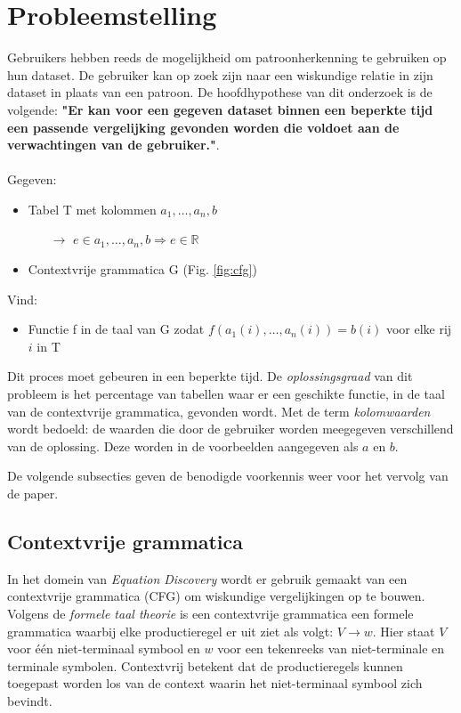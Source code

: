 \documentclass[Main.tex]{subfiles}
\begin{document}
\section{Probleemstelling}
Gebruikers hebben reeds de mogelijkheid om patroonherkenning te gebruiken op hun dataset. De gebruiker kan op zoek zijn naar een wiskundige relatie in zijn dataset in plaats van een patroon. De hoofdhypothese van dit onderzoek is de volgende: \textbf{"Er kan voor een gegeven dataset binnen een beperkte tijd een passende vergelijking gevonden worden die voldoet aan de verwachtingen van de gebruiker."}. \\ \\
\newpage
\noindent
Gegeven: 
\begin{itemize}
\item Tabel T met kolommen $a_{1},\dotsc,a_{n},b$ 
	\begin{itemize}
	\item[$\rightarrow$] $e \in a_{1},\dotsc,a_{n}, b \Rightarrow e \in \mathbb{R}$
	\end{itemize}
\item Contextvrije grammatica G (Fig. \ref{fig:cfg})
\end{itemize}
Vind:
\begin{itemize}
\item Functie f in de taal van G zodat $f(a_{1}(i),\dotsc ,a_{n}(i)) = b(i)$ voor elke rij $i$ in T
\end{itemize}
\noindent
Dit proces moet gebeuren in een beperkte tijd. De \textit{oplossingsgraad} van dit probleem is het percentage van tabellen waar er een geschikte functie, in de taal van de contextvrije grammatica, gevonden wordt. Met de term \textit{kolomwaarden} wordt bedoeld: de waarden die door de gebruiker worden meegegeven verschillend van de oplossing. Deze worden in de voorbeelden aangegeven als $a$ en $b$.

\par De volgende subsecties geven de benodigde voorkennis weer voor het vervolg van de paper.

\subsection{Contextvrije grammatica}
In het domein van \textit{Equation Discovery} wordt er gebruik gemaakt van een contextvrije grammatica (CFG) om wiskundige vergelijkingen op te bouwen\cite{equationDisc}. Volgens de \textit{formele taal theorie} \cite{cfg} is een contextvrije grammatica een formele grammatica waarbij elke productieregel er uit ziet als volgt: $V \rightarrow w$. Hier staat $V$  voor \'e\'en niet-terminaal symbool en $w$ voor een tekenreeks van niet-terminale en terminale symbolen. Contextvrij betekent dat de productieregels kunnen toegepast worden los van de context waarin het niet-terminaal symbool zich bevindt.
\end{document}

